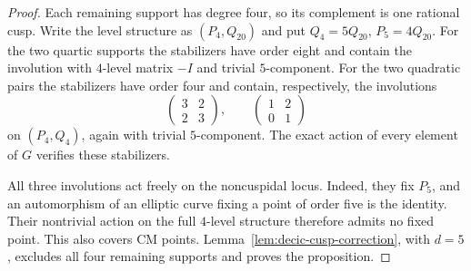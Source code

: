 \begin{proof}
Each remaining support has degree four, so its complement is
one rational cusp. Write the level structure as $(P_4,Q_{20})$
and put $Q_4=5Q_{20}$, $P_5=4Q_{20}$.
For the two quartic supports the stabilizers have order eight
and contain the involution with $4$-level matrix $-I$ and
trivial $5$-component. For the two quadratic pairs the stabilizers
have order four and contain, respectively, the involutions
\[
 \begin{pmatrix}3&2\\2&3\end{pmatrix},\qquad
 \begin{pmatrix}1&2\\0&1\end{pmatrix}
\]
on $(P_4,Q_4)$, again with trivial $5$-component.
The exact action of every element of $G$ verifies these stabilizers.

All three involutions act freely on the noncuspidal locus.
Indeed, they fix $P_5$, and an automorphism of an elliptic curve
fixing a point of order five is the identity. Their nontrivial
action on the full $4$-level structure therefore admits no fixed
point. This also covers CM points.
Lemma~\ref{lem:decic-cusp-correction}, with $d=5$, excludes all
four remaining supports and proves the proposition.
\end{proof}
